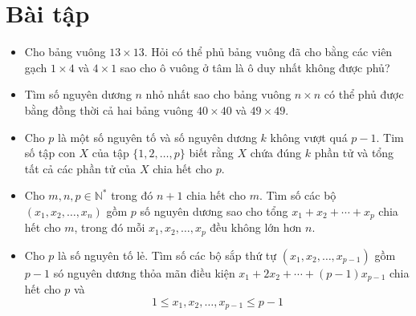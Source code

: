 \documentclass[12pt]{scrartcl}
\begin{document}
\section{\Large Bài tập}
\begin{itemize}[label=, leftmargin=0em, itemsep=0.5em]
\item \begin{btvn}
Cho bảng vuông $13 \times 13$. Hỏi có thể phủ bảng vuông đã cho bằng các viên gạch $1 \times 4$ và $4 \times 1$ sao cho ô vuông ở tâm là ô duy nhất không được phủ?
\end{btvn}
\item \begin{btvn}
  Tìm số nguyên dương $n$ nhỏ nhất sao cho bảng vuông $n \times n$ có thể phủ được bằng đồng thời cả hai bảng vuông $40 \times 40$ và $49 \times 49$.
\end{btvn}
\item \begin{btvn}Cho $p$ là một số nguyên tố và số nguyên dương $k$ không vượt quá $p-1$. Tim số tập con $X$ của tập $\{1,2, \ldots, p\}$ biết rằng $X$ chứa đúng $k$ phần tử và tổng tất cả các phần tử của $X$ chia hết cho $p$.

\end{btvn}

\item \begin{btvn}
  Cho $m, n, p \in \mathbb{N}^*$ trong đó $n+1$ chia hết cho $m$. Tìm số các bộ $\left(x_1, x_2, \ldots, x_n\right)$ gồm $p$ số nguyên dương sao cho tổng $x_1+x_2+\cdots+x_p$ chia hết cho $m$, trong đó mỗi $x_1, x_2, \ldots, x_p$ đều không lớn hơn $n$.
\end{btvn}
\item \begin{btvn}
  Cho $p$ là số nguyên tố lẻ. Tìm số các bộ sắp thứ tự $\left(x_1, x_2, \ldots, x_{p-1}\right)$ gồm $p-1$ só nguyên dương thỏa mãn điều kiện $x_1+2 x_2+\cdots+(p-1) x_{p-1}$ chia hết cho $p$ và
  $$
  1 \leq x_1, x_2, \ldots, x_{p-1} \leq p-1
  $$
  
\end{btvn}

\end{itemize}
\end{document}
